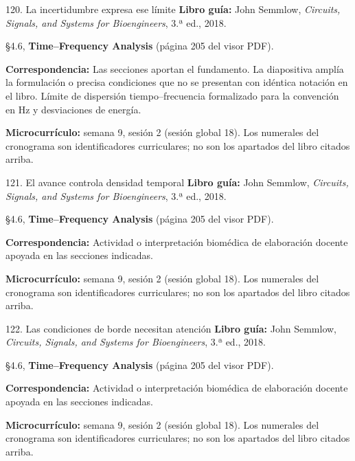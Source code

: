 \documentclass[
  10pt,
  ignorenonframetext,
  aspectratio=169,
  spanish,
]{beamer}
\begin{document}
\begin{frame}{120. La incertidumbre expresa ese límite}
\label{la-incertidumbre-expresa-ese-luxedmite}
\textbf{Libro guía:} John Semmlow, \emph{Circuits, Signals, and Systems
for Bioengineers}, 3.ª ed., 2018.

§4.6, \textbf{Time--Frequency Analysis} (página 205 del visor PDF).

\textbf{Correspondencia:} Las secciones aportan el fundamento. La
diapositiva amplía la formulación o precisa condiciones que no se
presentan con idéntica notación en el libro. Límite de dispersión
tiempo--frecuencia formalizado para la convención en Hz y desviaciones
de energía.

\textbf{Microcurrículo:} semana 9, sesión 2 (sesión global 18). Los
numerales del cronograma son identificadores curriculares; no son los
apartados del libro citados arriba.
\end{frame}

\begin{frame}{121. El avance controla densidad temporal}
\label{el-avance-controla-densidad-temporal}
\textbf{Libro guía:} John Semmlow, \emph{Circuits, Signals, and Systems
for Bioengineers}, 3.ª ed., 2018.

§4.6, \textbf{Time--Frequency Analysis} (página 205 del visor PDF).

\textbf{Correspondencia:} Actividad o interpretación biomédica de
elaboración docente apoyada en las secciones indicadas.

\textbf{Microcurrículo:} semana 9, sesión 2 (sesión global 18). Los
numerales del cronograma son identificadores curriculares; no son los
apartados del libro citados arriba.
\end{frame}

\begin{frame}{122. Las condiciones de borde necesitan atención}
\label{las-condiciones-de-borde-necesitan-atenciuxf3n}
\textbf{Libro guía:} John Semmlow, \emph{Circuits, Signals, and Systems
for Bioengineers}, 3.ª ed., 2018.

§4.6, \textbf{Time--Frequency Analysis} (página 205 del visor PDF).

\textbf{Correspondencia:} Actividad o interpretación biomédica de
elaboración docente apoyada en las secciones indicadas.

\textbf{Microcurrículo:} semana 9, sesión 2 (sesión global 18). Los
numerales del cronograma son identificadores curriculares; no son los
apartados del libro citados arriba.
\end{frame}
\end{document}
